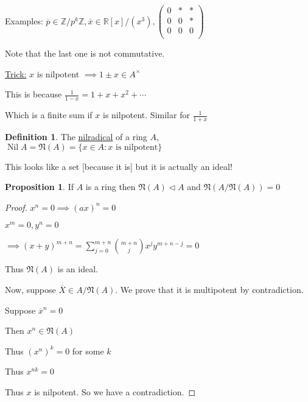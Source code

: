 \documentclass{article}
\theoremstyle{definition}
\newtheorem{definition}{Definition}
\newtheorem{proposition}{Proposition}
\begin{document}
Examples: \(\overline{p} \in \mathbb{Z} / p^k \mathbb{Z} , \overline{x} \in \mathbb{R} [x] / (x^3), \begin{pmatrix}
    0 & \ast &  \ast \\
    0 & 0 &  \ast \\
    0 & 0 &  0 \\
\end{pmatrix}\) 

Note that the last one is not commutative.

\underline{Trick:} \(x\) is nilpotent \(\implies 1\pm x \in A^\times\)

This is because \(\frac{1}{1-x}=1+x+x^2 + \cdots\)

Which is a finite sum if \(x\) is nilpotent. Similar for \(\frac{1}{1+x}\) 

\begin{definition}
    The \underline{nilradical} of a ring \(A\), \(\operatorname{Nil} A = \mathfrak{N}(A) = \{ x \in A : x \text{ is nilpotent}  \} \) 
\end{definition}

This looks like a set [because it is] but it is actually an ideal!

\begin{proposition}
    If \(A\) is a ring then \(\mathfrak{N}(A) \triangleleft A \) and \(\mathfrak{N}(A / \mathfrak{N}(A) ) = 0 \)  
\end{proposition}

\begin{proof}
    \(x^n = 0 \implies (ax)^n = 0\)
    
    \(x^m = 0, y^n=0\)
    
    \(\implies (x+y)^{m+n} = \displaystyle \sum_{j=0}^{m + n} \binom{m + n}{j} x^j y^{m+n-j} = 0\)
    
    Thus \(\mathfrak{N}(A) \) is an ideal.
    
    Now, suppose \(\overline{X}\in A / \mathfrak{N}(A)\). We prove that it is multipotent by contradiction.
    
    Suppose \(\overline{x}^n = 0 \)
    
    Then \(x^n \in \mathfrak{N}(A) \)
    
    Thus \((x^n)^k = 0\) for some \(k\) 

    Thus \(x^{nk} = 0 \)
    
    Thus \(x\) is nilpotent. So we have a contradiction.
    
\end{proof}
\end{document}
